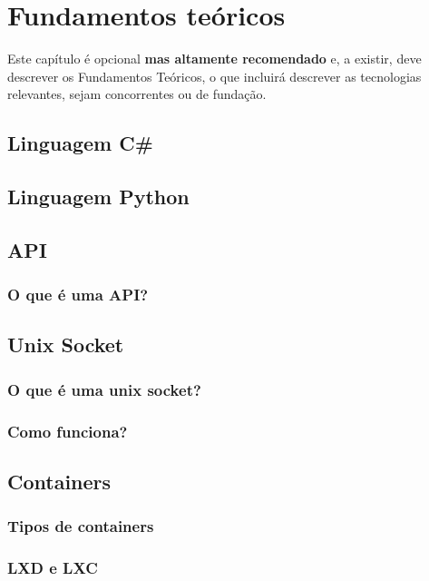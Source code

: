 \chapter{Fundamentos teóricos}
\label{chap:theo}

Este capítulo é opcional \textbf{mas altamente recomendado} e, a existir, deve descrever os Fundamentos Teóricos, o que incluirá descrever as tecnologias relevantes, sejam concorrentes ou de fundação.


\section{Linguagem C\#}

\section{Linguagem Python}

\section{API}

\subsection{O que é uma API?}

\section{Unix Socket}

\subsection{O que é uma unix socket?}

\subsection{Como funciona?}


\section{Containers}

\subsection{Tipos de containers}

\subsection{LXD e LXC}

